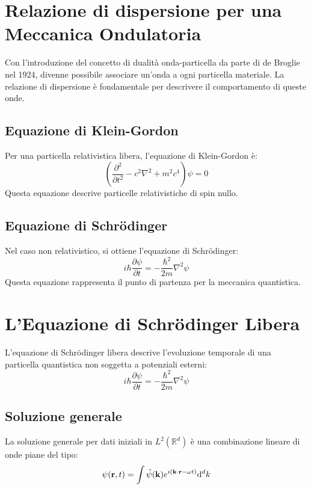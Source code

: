 \section{Relazione di dispersione per una Meccanica Ondulatoria}
Con l'introduzione del concetto di dualit\`a onda-particella da parte di de Broglie nel 1924, divenne possibile associare un'onda a ogni particella materiale. La relazione di dispersione \`e fondamentale per descrivere il comportamento di queste onde.

\subsection{Equazione di Klein-Gordon}
Per una particella relativistica libera, l'equazione di Klein-Gordon \`e:
\begin{equation}
    \left( \frac{\partial^2}{\partial t^2} - c^2 \nabla^2 + m^2c^4 \right) \psi = 0
\end{equation}
Questa equazione descrive particelle relativistiche di spin nullo.

\subsection{Equazione di Schr\"odinger}
Nel caso non relativistico, si ottiene l'equazione di Schr\"odinger:
\begin{equation}
    i \hbar \frac{\partial \psi}{\partial t} = -\frac{\hbar^2}{2m} \nabla^2 \psi
\end{equation}
Questa equazione rappresenta il punto di partenza per la meccanica quantistica.

\section{L'Equazione di Schr\"odinger Libera}
L'equazione di Schr\"odinger libera descrive l'evoluzione temporale di una particella quantistica non soggetta a potenziali esterni:
\begin{equation}
    i \hbar \frac{\partial \psi}{\partial t} = -\frac{\hbar^2}{2m} \nabla^2 \psi
\end{equation}

\subsection{Soluzione generale}
La soluzione generale per dati iniziali in $L^2(\mathbb{R}^d)$ \`e una combinazione lineare di onde piane del tipo:
\begin{equation}
    \psi(\vb{r}, t) = \int \tilde{\psi}(\vb{k}) e^{i(\vb{k} \cdot \vb{r} - \omega t)} \dd^d k
\end{equation}

